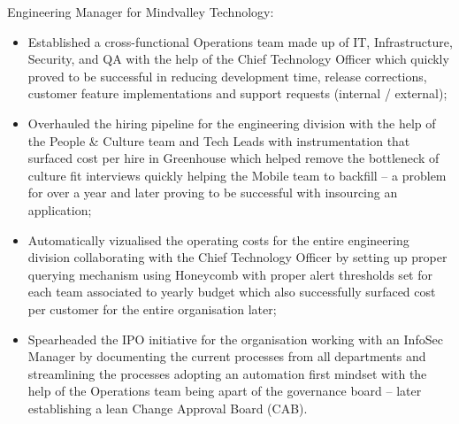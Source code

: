 \documentclass[11pt,a4paper,nolmodern,colorlinks=true,linkcolor=true]{moderncv}
\begin{document}
%
  {Engineering Manager for Mindvalley Technology:
    \begin{itemize}
      \item Established a cross-functional Operations team made up of IT, Infrastructure, Security, and QA with the help of the Chief Technology Officer which quickly proved to be successful in reducing development time, release corrections, customer feature implementations and support requests (internal / external);
      \item Overhauled the hiring pipeline for the engineering division with the help of the People \& Culture team and Tech Leads with instrumentation that surfaced cost per hire in Greenhouse which helped remove the bottleneck of culture fit interviews quickly helping the Mobile team to backfill -- a problem for over a year and later proving to be successful with insourcing an application;
      \item Automatically vizualised the operating costs for the entire engineering division collaborating with the Chief Technology Officer by setting up proper querying mechanism using Honeycomb with proper alert thresholds set for each team associated to yearly budget which also successfully surfaced cost per customer for the entire organisation later;
      \item Spearheaded the IPO initiative for the organisation working with an InfoSec Manager by documenting the current processes from all departments and streamlining the processes adopting an automation first mindset with the help of the Operations team being apart of the governance board -- later establishing a lean Change Approval Board (CAB).
    \end{itemize}
}

\pagebreak
\end{document}
